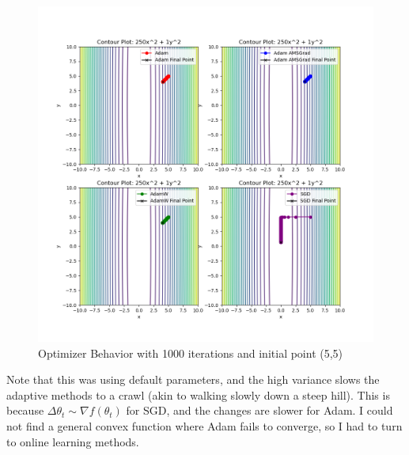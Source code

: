 \documentclass[landscape,twocolumn]{article}
\newcommand{\1}{\mathds{1}}
\begin{document}
\begin{figure}[H]
    \centering 
    \includegraphics[width=.9\linewidth]{../Notebooks/Optimizer_behavior_2d.png}
    \caption{Optimizer Behavior with 1000 iterations and initial point (5,5)}
    \label{fig:optim_2d}
\end{figure}
Note that this was using default parameters, and the high variance slows the adaptive methods to a crawl (akin to walking slowly down a steep hill). This is because \(\Delta \theta_t \sim \nabla f(\theta_t)\) for SGD, and the changes are slower for Adam. I could not find a general convex function where Adam fails to converge, so I had to turn to online learning methods. \newpage  
\end{document}
